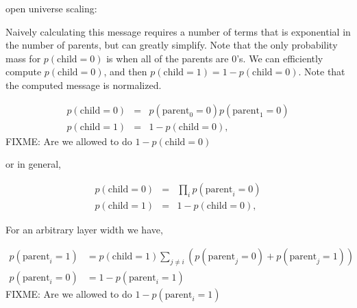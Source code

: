 open universe scaling:

Naively calculating this message requires a number of terms that is exponential in the number of parents, but can greatly simplify.  Note that the only probability mass for $p(\text{child}=0)$ is when all of the parents are 0's.  We can efficiently compute $p(\text{child}=0)$, and then $p(\text{child}=1) = 1 - p(\text{child}=0)$.  Note that the computed message is normalized.

\begin{eqnarray}
    p(\text{child}=0) &=& p(\text{parent}_0=0)p(\text{parent}_1=0) \nonumber \\
    p(\text{child}=1) &=& 1 - p(\text{child}=0),
\end{eqnarray}
FIXME: Are we allowed to do $1 - p(\text{child}=0)$

or in general,

\begin{eqnarray}
    p(\text{child}=0) &=& \prod_i p(\text{parent}_i=0) \nonumber \\
    p(\text{child}=1) &=& 1 - p(\text{child}=0),
\end{eqnarray}

For an arbitrary layer width we have,

\begin{align}
    p(\text{parent}_i = 1) &=  
    p(\text{child}=1) \sum_{j\neq i} \left( p(\text{parent}_j=0) + p(\text{parent}_j=1) \right) \nonumber \\
    p(\text{parent}_i = 0) &=  1 - p(\text{parent}_i = 1)
\end{align}
FIXME: Are we allowed to do $1 - p(\text{parent}_i = 1)$
